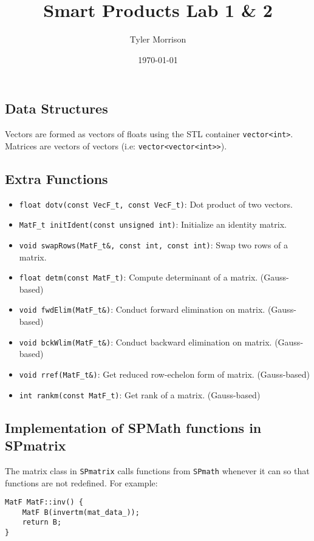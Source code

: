 \documentclass{article}
\title{Smart Products Lab 1 \& 2}
\author{Tyler Morrison}
\date\today
\begin{document}
\maketitle
\section{}
\subsection{Data Structures}
Vectors are formed as vectors of floats using the STL container \texttt{vector<int>}. Matrices are vectors of vectors (i.e: \texttt{vector<vector<int>>}).

\subsection{Extra Functions}

\begin{itemize}
	\item \texttt{float dotv(const VecF_t, const VecF_t)}: Dot product of two vectors.
	\item \texttt{MatF_t initIdent(const unsigned int)}: Initialize an identity matrix.
	\item \texttt{void swapRows(MatF_t\&, const int, const int)}: Swap two rows of a matrix.
	\item \texttt{float detm(const MatF_t)}: Compute determinant of a matrix. (Gauss-based)
	\item \texttt{void fwdElim(MatF_t\&)}: Conduct forward elimination on matrix. (Gauss-based)
	\item \texttt{void bckWlim(MatF_t\&)}: Conduct backward elimination on matrix. (Gauss-based)
	\item \texttt{void rref(MatF_t\&)}: Get reduced row-echelon form of matrix. (Gauss-based)
	\item \texttt{int rankm(const MatF_t)}: Get rank of a matrix. (Gauss-based)
\end{itemize}

\subsection{Implementation of SPMath functions in SPmatrix}
The matrix class in \texttt{SPmatrix} calls functions from \texttt{SPmath} whenever it can so that functions are not redefined. For example:


\begin{lstlisting}
MatF MatF::inv() {
	MatF B(invertm(mat_data_));
	return B;
}
\end{lstlisting}
\end{document}
